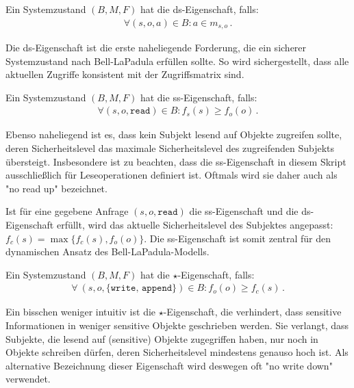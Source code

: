 \begin{definition}
	Ein Systemzustand \((B, M, F)\) hat die ds-Eigenschaft, falls:
	\begin{align*} 
		\forall (s, o, a) \in B : a \in m_{s,o}\, .
	\end{align*}
\end{definition}

Die ds-Eigenschaft ist die erste naheliegende Forderung, die ein sicherer Systemzustand nach Bell-LaPadula erfüllen sollte. So wird sichergestellt, dass alle aktuellen Zugriffe konsistent mit der Zugriffsmatrix sind. 

\begin{definition}
	Ein Systemzustand \((B, M, F)\) hat die ss-Eigenschaft, falls:
	\begin{align*} 
		\forall (s, o, \texttt{read}) \in B : f_s(s) \geq f_o(o)\, .
	\end{align*}
\end{definition}

Ebenso naheliegend ist es, dass kein Subjekt lesend auf Objekte zugreifen sollte, deren Sicherheitslevel das maximale
Sicherheitslevel des zugreifenden Subjekts übersteigt. Insbesondere ist zu beachten, dass die ss-Eigenschaft in diesem
Skript ausschließlich für Leseoperationen definiert ist. Oftmals wird sie daher auch als "{}no read up"{} bezeichnet.

Ist für eine gegebene Anfrage \((s, o, \texttt{read})\) die ss-Eigenschaft und die ds-Eigenschaft erfüllt, wird das aktuelle Sicherheitslevel des Subjektes angepasst:
\(f_c(s) = \max \{f_c(s), f_o(o)\}\). Die ss-Eigenschaft ist somit zentral für den dynamischen Ansatz des Bell-LaPadula-Modells.

\begin{definition}
	Ein Systemzustand \((B, M, F)\) hat die \(\star\)-Eigenschaft, falls: 
	\begin{align*}
		\forall\ (s, o, \texttt{\{write, append\}}) \in B : f_o(o) \geq f_c(s)\, .
	\end{align*}
\end{definition}

Ein bisschen weniger intuitiv ist die \(\star\)-Eigenschaft, die verhindert, dass sensitive Informationen in weniger sensitive Objekte geschrieben werden. Sie verlangt, dass Subjekte, die lesend auf (sensitive) Objekte zugegriffen haben, nur noch in Objekte schreiben dürfen, deren Sicherheitslevel mindestens genauso hoch ist. Als alternative Bezeichnung dieser Eigenschaft wird deswegen oft "{}no write down"{} verwendet.

